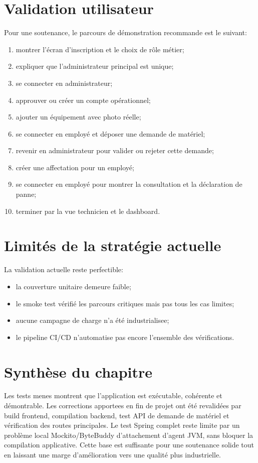 ﻿\documentclass[12pt,a4paper,oneside]{report}
\begin{document}
\section{Validation utilisateur}
Pour une soutenance, le parcours de démonstration recommande est le suivant:
\begin{enumerate}
  \item montrer l'écran d'inscription et le choix de rôle métier;
  \item expliquer que l'administrateur principal est unique;
  \item se connecter en administrateur;
  \item approuver ou créer un compte opérationnel;
  \item ajouter un équipement avec photo réelle;
  \item se connecter en employé et déposer une demande de matériel;
  \item revenir en administrateur pour valider ou rejeter cette demande;
  \item créer une affectation pour un employé;
  \item se connecter en employé pour montrer la consultation et la déclaration de panne;
  \item terminer par la vue technicien et le dashboard.
\end{enumerate}

\section{Limités de la stratégie actuelle}
La validation actuelle reste perfectible:
\begin{itemize}
  \item la couverture unitaire demeure faible;
  \item le smoke test vérifié les parcours critiques mais pas tous les cas limites;
  \item aucune campagne de charge n'a été industrialisee;
  \item le pipeline CI/CD n'automatise pas encore l'ensemble des vérifications.
\end{itemize}

\section{Synthèse du chapitre}
Les tests menes montrent que l'application est exécutable, cohérente et démontrable. Les corrections apportees en fin de projet ont été revalidées par build frontend, compilation backend, test API de demande de matériel et vérification des routes principales. Le test Spring complet reste limite par un problème local Mockito/ByteBuddy d'attachement d'agent JVM, sans bloquer la compilation applicative. Cette base est suffisante pour une soutenance solide tout en laissant une marge d'amélioration vers une qualité plus industrielle.
\end{document}
